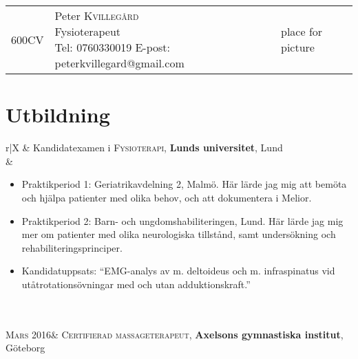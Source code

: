 \documentclass[11pt,a4paper]{article}
\makeatletter
\newcommand\CVsize{\@setfontsize\Huge{60}{0}}
\makeatother
\begin{document}
\pagestyle{empty}

\begin{tabularx}{\linewidth}
		{@{} >{\centering\arraybackslash} p{2.65cm}
		X
		@{}p{2.65cm}}
	\CVsize CV & 
	
	{\centering
		{\Huge Peter \textsc{Kvillegård} \\
			\LARGE Fysioterapeut \\[5pt]
			\normalsize Tel: 0760330019 \hspace{0.3em} \textbar \hspace{0.3em} E-post: peterkvillegard@gmail.com
		}\par
	}
	
	 & place for picture \\
\end{tabularx}

\section{Utbildning}
\begin{tabularx}{\textwidth}{r|X}	
	& Kandidatexamen i \textsc{Fysioterapi}, \textbf{Lunds universitet}, Lund\\
	&\footnotesize{\vspace{-5pt}
		 \begin{itemize}[leftmargin=10pt, topsep=-12.5pt]

		\item Praktikperiod 1: Geriatrikavdelning 2, Malmö. Här lärde jag mig att bemöta och hjälpa patienter med olika behov, och att dokumentera i Melior.
		\item Praktikperiod 2: Barn- och ungdomshabiliteringen, Lund. Här lärde jag mig mer om patienter med olika neuro\-logiska tillstånd, samt undersökning och rehabiliteringsprinciper.
		\item Kandidatuppsats: ``EMG-analys av m. deltoideus och m. infraspinatus vid utåt\-rotations\-övningar med och utan adduktionskraft.''
		\end{itemize}\vspace{-30pt} 
	}\\
	 \\
	\textsc{Mars} 2016& \textsc{Certifierad massageterapeut}, \textbf{Axelsons gymnastiska institut}, Göteborg\\
	 \\
\end{tabularx}
\end{document}
